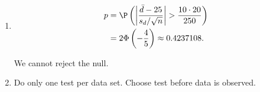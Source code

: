 \begin{solution}
\begin{enumerate}[label = (\alph*)]
    \item 

    \begin{align*}
        p &= \P\left( \left|\frac{\bar{d} - 25}{s_d/\sqrt{n}}\right| > \frac{10 \cdot 20}{250} \right) \\
        &= 2\Phi\left(-\frac{4}{5}\right) \approx 0.4237108.
    \end{align*}

    We cannot reject the null.

    \item Do only one test per data set. Choose test before data is observed.

\end{enumerate}

\end{solution}

